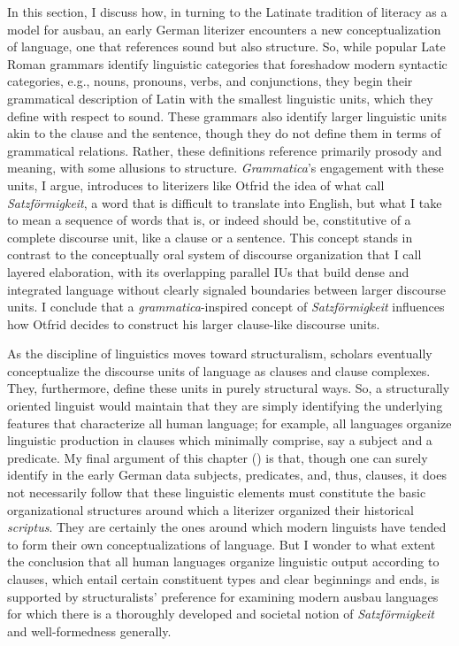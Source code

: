 In this section, I discuss how, in turning to the Latinate tradition of literacy as a model for ausbau, an early German literizer encounters a new conceptualization of language, one that references sound but also structure. So, while popular Late Roman grammars identify linguistic categories that foreshadow modern syntactic categories, e.g., nouns, pronouns, verbs, and conjunctions, they begin their grammatical description of Latin with the smallest linguistic units, which they define with respect to sound. These grammars also identify larger linguistic units akin to the clause and the sentence, though they do not define them in terms of grammatical relations. Rather, these definitions reference primarily prosody and meaning, with some allusions to structure. \textit{Grammatica}’s engagement with these units, I argue, introduces to literizers like Otfrid the idea of what \citet{KochOesterreicher1994} call \textit{Satzförmigkeit}, a word that is difficult to translate into English, but what I take to mean a sequence of words that is, or indeed should be, constitutive of a complete discourse unit, like a clause or a sentence. This concept stands in contrast to the conceptually oral system of discourse organization that I call layered elaboration, with its overlapping parallel IUs that build dense and integrated language without clearly signaled boundaries between larger discourse units. I conclude that a \textit{grammatica}{}-inspired concept of \textit{Satzförmigkeit} influences how Otfrid decides to construct his larger clause-like discourse units.

As the discipline of linguistics moves toward structuralism, scholars eventually conceptualize the discourse units of language as clauses and clause complexes. They, furthermore, define these units in purely structural ways. So, a structurally oriented linguist would maintain that they are simply identifying the underlying features that characterize all human language; for example, all languages organize linguistic production in clauses which minimally comprise, say a subject and a predicate. My final argument of this chapter () is that, though one can surely identify in the early German data subjects, predicates, and, thus, clauses, it does not necessarily follow that these linguistic elements must constitute the basic organizational structures around which a literizer organized their historical \textit{scriptus}. They are certainly the ones around which modern linguists have tended to form their own conceptualizations of language. But I wonder to what extent the conclusion that all human languages organize linguistic output according to clauses, which entail certain constituent types and clear beginnings and ends, is supported by structuralists’ preference for examining modern ausbau languages for which there is a thoroughly developed and societal notion of \textit{Satzförmigkeit} and well-formedness generally.

